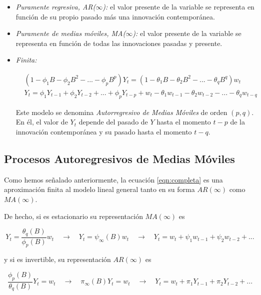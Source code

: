 \documentclass[a4paper,10pt]{article}
\begin{document}
\begin{itemize}
 \item \textit{Puramente regresiva, AR($\infty$):} el valor presente de la variable se representa en función de su propio pasado más una innovación contemporánea.

 \item \textit{Puramente de medias móviles, MA($\infty$):} el valor presente de la variable se representa en función de todas las innovaciones pasadas y presente.

 \item \textit{Finita:}

 \begin{equation}\label{eqn:completa}
 \begin{split}
 &(1-\phi_1B - \phi_2B^2 - ... - \phi_pB^p) Y_t = (1-\theta_1B - \theta_2B^2 - ... - \theta_qB^q) w_t \\
 &Y_t = \phi_1Y_{t-1} + \phi_2Y_{t-2} + ... + \phi_pY_{t-p} + w_t -\theta_1w_{t-1} - \theta_2w_{t-2} - ... - \theta_qw_{t-q}
 \end{split}
 \end{equation}

 Este modelo se denomina \textit{Autorregresivo de Medias Móviles} de orden $(p,q)$. En él, el valor de $Y_t$ depende del pasado de $Y$ hasta el momento $t-p$ de la innovación contemporánea y su pasado hasta el momento $t-q$.
\end{itemize}

\subsection{Procesos Autoregresivos de Medias Móviles}

Como hemos señalado anteriormente, la ecuación \ref{eqn:completa} es una aproximación finita al modelo lineal general tanto en su forma $AR(\infty)$ como $MA(\infty)$.

De hecho, si es estacionario su representación $MA(\infty)$ es

\begin{equation}
Y_t = \frac{\theta_q(B)}{\phi_p(B)} w_t \quad \to \quad Y_t = \psi_\infty(B) w_t \quad \to \quad Y_t = w_t + \psi_1 w_{t-1} + \psi_2 w_{t-2} + ...
\end{equation}

y si es invertible, su representación $AR(\infty)$ es

\begin{equation}
\frac{\phi_p(B)}{\theta_q(B)} Y_t = w_t \quad \to \quad \pi_\infty(B) Y_t = w_t \quad \to \quad Y_t = w_t + \pi_1 Y_{t-1} + \pi_2 Y_{t-2} + ...
\end{equation}
\end{document}
